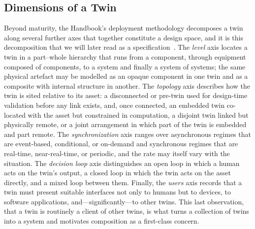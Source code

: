 \documentclass[conference]{IEEEtran}
\begin{document}
\subsection{Dimensions of a Twin}
Beyond maturity, the Handbook's deployment methodology decomposes a twin along
several further axes that together constitute a design space, and it is this
decomposition that we will later read as a specification~\cite{hamzaoui2024}.
The \emph{level} axis locates a twin in a part--whole hierarchy that runs from a
component, through equipment composed of components, to a system and finally a
system of systems; the same physical artefact may be modelled as an opaque
component in one twin and as a composite with internal structure in another. The
\emph{topology} axis describes how the twin is sited relative to its asset: a
disconnected or pre-twin used for design-time validation before any link
exists, and, once connected, an embedded twin co-located with the asset but
constrained in computation, a disjoint twin linked but physically remote, or a
joint arrangement in which part of the twin is embedded and part remote. The
\emph{synchronization} axis ranges over asynchronous regimes that are
event-based, conditional, or on-demand and synchronous regimes that are
real-time, near-real-time, or periodic, and the rate may itself vary with the
situation. The \emph{decision loop} axis distinguishes an open loop in which a
human acts on the twin's output, a closed loop in which the twin acts on the
asset directly, and a mixed loop between them. Finally, the \emph{users} axis
records that a twin must present suitable interfaces not only to humans but to
devices, to software applications, and---significantly---to other twins. This
last observation, that a twin is routinely a client of other twins, is what
turns a collection of twins into a system and motivates composition as a
first-class concern.
\end{document}
